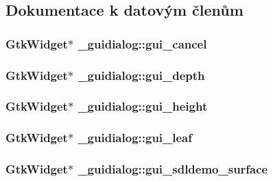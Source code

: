 \subsection{Dokumentace k datovým členům}
\hypertarget{struct__guidialog_aacddf0167ab045db9d05d85052901052}{
\subsubsection[{gui\_\-cancel}]{\setlength{\rightskip}{0pt plus 5cm}GtkWidget$\ast$ {\bf \_\-guidialog::gui\_\-cancel}}}
\label{struct__guidialog_aacddf0167ab045db9d05d85052901052}
\hypertarget{struct__guidialog_a6e3f4a245029a291984ed008422ccb3e}{
\subsubsection[{gui\_\-depth}]{\setlength{\rightskip}{0pt plus 5cm}GtkWidget$\ast$ {\bf \_\-guidialog::gui\_\-depth}}}
\label{struct__guidialog_a6e3f4a245029a291984ed008422ccb3e}
\hypertarget{struct__guidialog_a576abdf065101bb3af7fd1d045235c7b}{
\subsubsection[{gui\_\-height}]{\setlength{\rightskip}{0pt plus 5cm}GtkWidget$\ast$ {\bf \_\-guidialog::gui\_\-height}}}
\label{struct__guidialog_a576abdf065101bb3af7fd1d045235c7b}
\hypertarget{struct__guidialog_a9195a25c2720673c3f19fdf91e79f6a2}{
\subsubsection[{gui\_\-leaf}]{\setlength{\rightskip}{0pt plus 5cm}GtkWidget$\ast$ {\bf \_\-guidialog::gui\_\-leaf}}}
\label{struct__guidialog_a9195a25c2720673c3f19fdf91e79f6a2}
\hypertarget{struct__guidialog_a129528d8a16803cce010dc3dfab8797a}{
\subsubsection[{gui\_\-sdldemo\_\-surface}]{\setlength{\rightskip}{0pt plus 5cm}GtkWidget$\ast$ {\bf \_\-guidialog::gui\_\-sdldemo\_\-surface}}}
